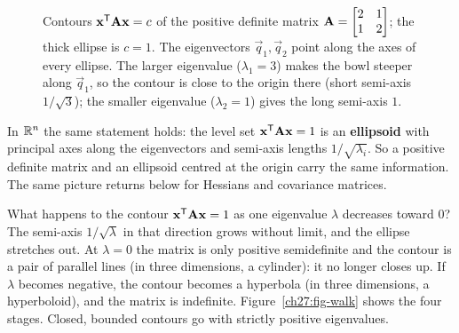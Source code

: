 \begin{figure}[htbp]
\caption{Contours $\mathbf{x}^{\mathsf{T}}\mathbf{A}\mathbf{x}=c$ of the positive definite matrix
$\mathbf{A}=\begin{bmatrix}2&1\\1&2\end{bmatrix}$; the thick ellipse is $c=1$. The eigenvectors
$\vec{q}_1,\vec{q}_2$ point along the axes of every ellipse. The larger eigenvalue ($\lambda_1=3$)
makes the bowl steeper along $\vec{q}_1$, so the contour is close to the origin there (short
semi-axis $1/\sqrt3$); the smaller eigenvalue ($\lambda_2=1$) gives the long semi-axis $1$.}
\label{ch27:fig-ellipse}
\end{figure}

In $\mathbb{R}^n$ the same statement holds: the level set $\mathbf{x}^{\mathsf{T}}\mathbf{A}\mathbf{x} = 1$ is an
\textbf{ellipsoid} with principal axes along the eigenvectors and semi-axis lengths
$1/\sqrt{\lambda_i}$. So a positive definite matrix and an ellipsoid centred at the origin carry the
same information. The same picture returns below for Hessians and covariance matrices.

\begin{walkbox}
What happens to the contour $\mathbf{x}^{\mathsf{T}}\mathbf{A}\mathbf{x}=1$ as one eigenvalue $\lambda$ decreases toward
$0$? The semi-axis $1/\sqrt\lambda$ in that direction grows without limit, and the ellipse stretches
out. At $\lambda = 0$ the matrix is only positive semidefinite and the contour is a pair of parallel
lines (in three dimensions, a cylinder): it no longer closes up. If $\lambda$ becomes negative, the
contour becomes a hyperbola (in three dimensions, a hyperboloid), and the matrix is indefinite.
Figure~\ref{ch27:fig-walk} shows the four stages. Closed, bounded contours go with strictly positive
eigenvalues.
\end{walkbox}


